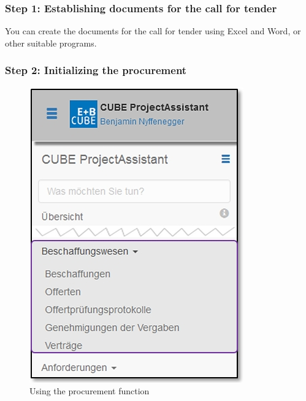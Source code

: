 \subsubsection{Step 1: Establishing documents for the call for tender}

You can create the documents for the call for tender using Excel and Word, or other suitable programs.

\subsubsection{Step 2: Initializing the procurement}

\begin{figure}   %
  \vspace{-35pt}      %
  \begin{center}
    \includegraphics[width=1\linewidth]{../chapters/07_Beschaffungswesen/pictures/7-1-2_Menu_Beschaffungswesen.jpg}
  \end{center}
  \vspace{-20pt}
  \caption{Using the procurement function}
  \vspace{-10pt}
\end{figure}

